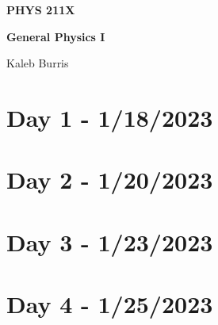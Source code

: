 \documentclass[12pt, letterpaper]{book}
\begin{document}
    \begin{titlepage}
        \Huge \textbf{PHYS 211X}

        \huge \textbf{General Physics I}

        \vfill

        \Large Kaleb Burris
    \end{titlepage}

    \section*{Day 1 - 1/18/2023}

    

    \section*{Day 2 - 1/20/2023}

    

    \section*{Day 3 - 1/23/2023}

    

    \section*{Day 4 - 1/25/2023}

    
\end{document}
